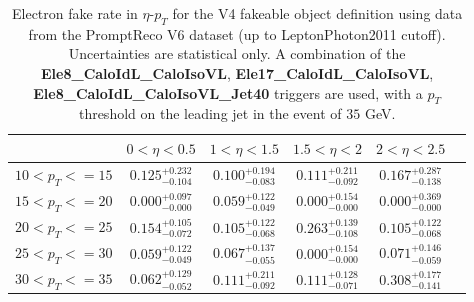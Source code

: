 \begin{table}[!htbp]
\begin{center}
\begin{tabular}{|c|c|c|c|c|c|}

\hline
                       &        $0<\eta<0.5$              &        $1<\eta<1.5$              &        $1.5<\eta<2$              &        $2<\eta<2.5$               \\
\hline
    $10 < p_{T} <= 15$ &        $0.125^{+0.232}_{-0.104}$ &        $0.100^{+0.194}_{-0.083}$ &        $0.111^{+0.211}_{-0.092}$ &        $0.167^{+0.287}_{-0.138}$  \\ 
 \hline
    $15 < p_{T} <= 20$ &        $0.000^{+0.097}_{-0.000}$ &        $0.059^{+0.122}_{-0.049}$ &        $0.000^{+0.154}_{-0.000}$ &        $0.000^{+0.369}_{-0.000}$  \\ 
 \hline
    $20 < p_{T} <= 25$ &        $0.154^{+0.105}_{-0.072}$ &        $0.105^{+0.122}_{-0.068}$ &        $0.263^{+0.139}_{-0.108}$ &        $0.105^{+0.122}_{-0.068}$  \\ 
 \hline
    $25 < p_{T} <= 30$ &        $0.059^{+0.122}_{-0.049}$ &        $0.067^{+0.137}_{-0.055}$ &        $0.000^{+0.154}_{-0.000}$ &        $0.071^{+0.146}_{-0.059}$  \\ 
 \hline
    $30 < p_{T} <= 35$ &        $0.062^{+0.129}_{-0.052}$ &        $0.111^{+0.211}_{-0.092}$ &        $0.111^{+0.128}_{-0.071}$ &        $0.308^{+0.177}_{-0.141}$  \\ 
 \hline

\end{tabular}
\caption{Electron fake rate in $\eta$-$p_T$ for the V4 fakeable object definition using data from the PromptReco V6 dataset (up to LeptonPhoton2011 cutoff). 
Uncertainties are statistical only. A combination of the {\bf Ele8\_CaloIdL\_CaloIsoVL}, {\bf Ele17\_CaloIdL\_CaloIsoVL}, 
{\bf Ele8\_CaloIdL\_CaloIsoVL\_Jet40} triggers are used, with a $p_{T}$ threshold on the leading jet in
the event of $35$ GeV. }
\label{tab:ele_fr_V4_jet35_prv6}
\end{center}
\end{table}


